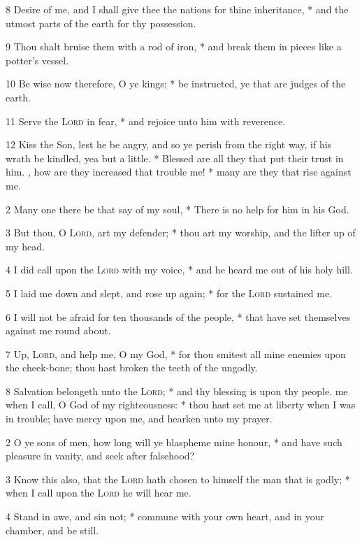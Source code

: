 8 Desire of me, and I shall give thee the nations for thine inheritance, * and the utmost parts of the earth for thy possession.\par
9 Thou shalt bruise them with a rod of iron, * and break them in pieces like a potter's vessel.\par
10 Be wise now therefore, O ye kings; * be instructed, ye that are judges of the earth.\par
11 Serve the {\textsc{Lord}} in fear, * and rejoice unto him with reverence.\par
12 Kiss the Son, lest he be angry, and so ye perish from the right way, if his wrath be kindled, yea but a little. * Blessed are all they that put their trust in him.
, how are they increased that trouble me! * many are they that rise against me.\par
2 Many one there be that say of my soul, * There is no help for him in his God.\par
3 But thou, O {\textsc{Lord}}, art my defender; * thou art my worship, and the lifter up of my head.\par
4 I did call upon the {\textsc{Lord}} with my voice, * and he heard me out of his holy hill.\par
5 I laid me down and slept, and rose up again; * for the {\textsc{Lord}} sustained me.\par
6 I will not be afraid for ten thousands of the people, * that have set themselves against me round about.\par
7 Up, {\textsc{Lord}}, and help me, O my God, * for thou smitest all mine enemies upon the cheek-bone; thou hast broken the teeth of the ungodly.\par
8 Salvation belongeth unto the {\textsc{Lord}}; * and thy blessing is upon thy people.
 me when I call, O God of my righteousness: * thou hast set me at liberty when I was in trouble; have mercy upon me, and hearken unto my prayer.\par
2 O ye sons of men, how long will ye blaspheme mine honour, * and have such pleasure in vanity, and seek after falsehood?\par
3 Know this also, that the {\textsc{Lord}} hath chosen to himself the man that is godly; * when I call upon the {\textsc{Lord}} he will hear me.\par
4 Stand in awe, and sin not; * commune with your own heart, and in your chamber, and be still.\par
